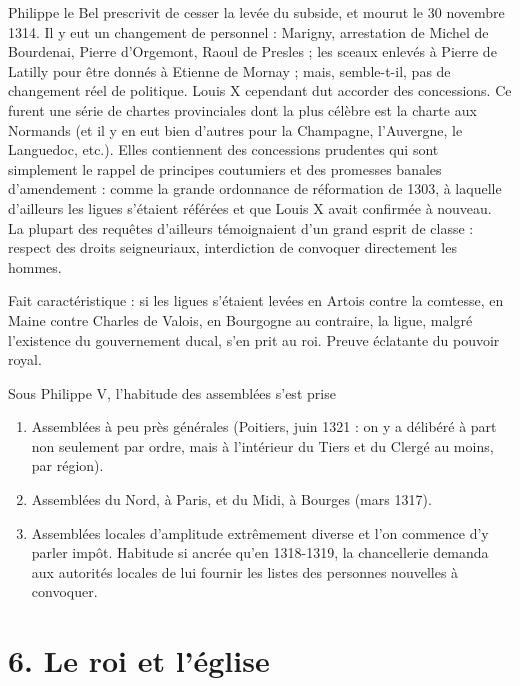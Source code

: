 \documentclass[french,twoside]{book} %
\newcommand{\labelchar}[1]{{\color{rubric}\bf #1}}
\newcommand\chapteropen{} %
\newcommand\chapterclose{} %
\begin{document}
\label{p47} Philippe le Bel prescrivit de cesser la levée du subside, et mourut le 30 novembre 1314. Il y eut un changement de personnel : Marigny, arrestation de Michel de Bourdenai, Pierre d’Orgemont, Raoul de Presles ; les sceaux enlevés à Pierre de Latilly pour être donnés à Etienne de Mornay ; mais, semble-t-il, pas de changement réel de politique. Louis X cependant dut accorder des concessions. Ce furent une série de chartes provinciales dont la plus célèbre est la charte aux Normands (et il y en eut bien d’autres pour la Champagne, l’Auvergne, le Languedoc, etc.). Elles contiennent des concessions prudentes qui sont simplement le rappel de principes coutumiers et des promesses banales d’amendement : comme la grande ordonnance de réformation de 1303, à laquelle d’ailleurs les ligues s’étaient référées et que Louis X avait confirmée à nouveau. La plupart des requêtes d’ailleurs témoignaient d’un grand esprit de classe : respect des droits seigneuriaux, interdiction de convoquer directement les hommes.\par
Fait caractéristique : si les ligues s’étaient levées en Artois contre la comtesse, en Maine contre Charles de Valois, en Bourgogne au contraire, la ligue, malgré l’existence du gouvernement ducal, s’en prit au roi. Preuve éclatante du pouvoir royal.\par
\bigbreak
\noindent \labelchar{5)} Sous Philippe V, l’habitude des assemblées s’est prise\par

\begin{enumerate}[itemsep=0pt,]
\item Assemblées à peu près générales (Poitiers, juin 1321 : on y a délibéré à part non seulement par ordre, mais à l’intérieur du Tiers et du Clergé au moins, par région).
\item Assemblées du Nord, à Paris, et du Midi, à Bourges (mars 1317).
\item Assemblées locales d’amplitude extrêmement diverse et l’on commence d’y parler impôt. Habitude si ancrée qu’en 1318-1319, la chancellerie demanda aux autorités locales de lui fournir les listes des personnes nouvelles à convoquer.

\end{enumerate}\chapterclose


\chapteropen
\chapter[6. Le roi et l’église]{\textsc{6. }Le roi et l’église}
\label{c06}
\end{document}
